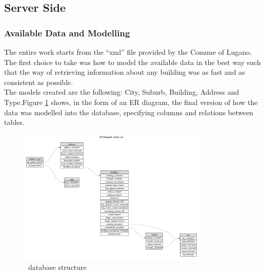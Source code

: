 \subsection{Server Side}
\subsubsection{Available Data and Modelling}
The entire work starts from the ``xml'' file provided by the Comune of Lugano. The first choice to take was how to model the available data in the best way such that the way of retrieving information about any building was as fast and as consistent as possible.\\
The models created are the following: City, Suburb, Building, Address and Type.Figure \ref{fig:db_structure} shows, in the form of an ER diagram, the final version of how the data was modelled into the database, specifying columns and relations between tables.
\begin{figure}[H]
\centering
\includegraphics[width=0.8\textwidth]{chapter3/images/db_structure}
\caption{\applicationName\ database structure}
\label{fig:db_structure}
\end{figure}

